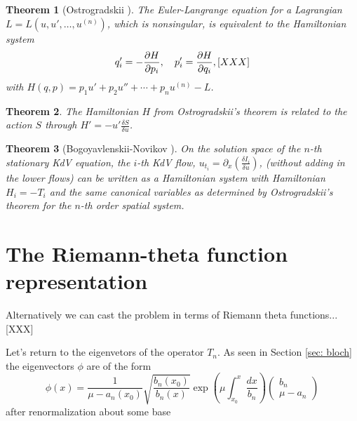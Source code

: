 \documentclass[12pt, a4paper]{article}
\newcommand{\pp}[2]{{\partial #1 \over \partial #2}}
\newtheorem{theorem}{Theorem}
\begin{document}
\begin{theorem}[Ostrogradskii \cite{Ost}]
  The Euler-Langrange equation for a Lagrangian $L = L(u, u', \ldots,
  u^{(n)})$, which is nonsingular, is equivalent to the Hamiltonian
  system
  \[
    q_i' = - \pp{H}{p_i},  \quad p_i' = \pp{H}{q_i}, [XXX]
  \]
  with $H(q,p) = p_1u' + p_2u'' + \cdots + p_n u^{(n)}-L$.
\end{theorem}

\begin{theorem}
  The Hamiltonian $H$ from Ostrogradskii's theorem is related to the
  action $S$ through $H'=-u' \frac{\delta S}{\delta u}$.
\end{theorem}

\begin{theorem}[Bogoyavlenskii-Novikov \cite{BN} ]
  On the solution space of the $n$-th stationary KdV equation, the
  $i$-th KdV flow, $u_{t_i} = \partial_x \left( \frac{\delta I_i}{\delta
    u} \right)$, (without adding in the lower flows) can be written as a
  Hamiltonian system with Hamiltonian $H_i = -T_i$ and the same
  canonical variables as determined by Ostrogradskii's theorem for the
  $n$-th order spatial system.
\end{theorem}



\section{The Riemann-theta function representation}



Alternatively we can cast the problem in terms of Riemann theta
functions...  [XXX]

Let's return to the eigenvetors of the operator $T_n$. As seen in
Section \ref{sec: bloch} the eigenvectors $\phi$ are of the form
\begin{equation*}
  \phi(x)
  =
  \frac{1}{\mu-a_n(x_0)} \sqrt{\frac{b_n(x_0)}{b_n(x)}}
  \exp \left( \mu \int_{x_0}^x \frac{dx}{b_n} \right)
  \begin{pmatrix}
    b_n \\ \mu-a_n
  \end{pmatrix}
\end{equation*}
after renormalization about some base



\newpage
\appendix
\end{document}
